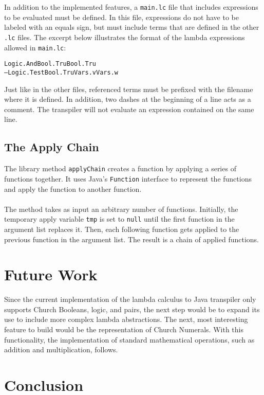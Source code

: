 \documentclass[11pt]{article}
\begin{document}
\\
\\
In addition to the implemented features, a \texttt{main.lc} file that includes expressions to be evaluated must be defined. In this file, expressions do not have to be labeled with an equals sign, but must include terms that are defined in the other \texttt{.lc} files. The excerpt below illustrates the format of the lambda expressions allowed in \texttt{main.lc}:
\begin{alltt}
Logic.And Bool.Tru Bool.Tru
-- Logic.Test Bool.Tru Vars.v Vars.w
\end{alltt}
Just like in the other files, referenced terms must be prefixed with the filename where it is defined. In addition, two dashes at the beginning of a line acts as a comment. The transpiler will not evaluate an expression contained on the same line.

\subsection{The Apply Chain}

The library method \texttt{applyChain} creates a function by applying a series of functions together. It uses Java's \texttt{Function} interface to represent the functions and apply the function to another function.
\\
\\
The method takes as input an arbitrary number of functions. Initially, the temporary apply variable \texttt{tmp} is set to \texttt{null} until the first function in the argument list replaces it. Then, each following function gets applied to the previous function in the argument list. The result is a chain of applied functions.

\section{Future Work}

Since the current implementation of the lambda calculus to Java transpiler only supports Church Booleans, logic, and pairs, the next step would be to expand its use to include more complex lambda abstractions. The next, most interesting feature to build would be the representation of Church Numerals. With this functionality, the implementation of standard mathematical operations, such as addition and multiplication, follows.

\section{Conclusion}
\end{document}
